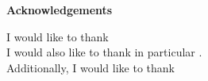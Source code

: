 \documentclass[Bachelorarbeit.tex]{subfiles}
\begin{document}
\newpage
\begin{center}
\textbf{Acknowledgements}
\end{center}

\noindent
I would like to thank \\

\noindent
I would also like to thank in particular  .\\

\noindent
Additionally, I would like to thank \\

\newpage


\newpage
\end{document}
